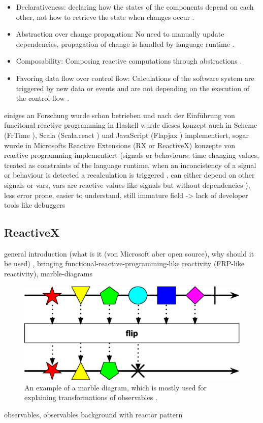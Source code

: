 \documentclass[Bachelor,BIF,english]{twbook}
\begin{document}
\begin{itemize}
\item Declarativeness: declaring how the states of the components depend on each other, not how to retrieve the state when changes occur \cite[p.~2]{PositivEffectOfRP}.
\item Abstraction over change propagation: No need to manually update dependencies, propagation of change is handled by language runtime \cite[p.~2]{PositivEffectOfRP}.
\item Composability: Composing reactive computations through abstractions \cite[p.~2]{PositivEffectOfRP}.
\item Favoring data flow over control flow: Calculations of the software system are triggered by new data or events and are not depending on the execution of the control flow \cite[p.~2]{PositivEffectOfRP}.
\end{itemize}
einiges an Forschung wurde schon betrieben und nach der Einführung von funcitonal reactive programming in Haskell wurde dieses konzept auch in Scheme (FrTime \cite{FrTime}), Scala (Scala.react \cite{DeprecatingOP}) und JavaScript (Flapjax \cite{Flapjax}) implementiert, sogar wurde in Microsofts Reactive Extensions (RX or ReactiveX) konzepte von reactive programming implementiert \cite[p.~954]{RPWalkthrough} \cite[p.~796]{DebuggingRP} \cite[p.~2]{PositivEffectOfRP}
(signals or behaviours: time changing values, treated as constraints of the language runtime, when an inconcistency of a signal or behaviour is detected a recalculation is triggered \cite[p.~797]{DebuggingRP} \cite[p.~3]{PositivEffectOfRP}, can either depend on other signals or vars, vars are reactive values like signals but without dependencies \cite[p.~2]{PositivEffectOfRP}), less error prone, easier to understand, still immature field -> lack of developer tools like debuggers \cite[p.~796]{DebuggingRP}

\subsection{ReactiveX}
general introduction (what is it \cite{ReactiveExtensions} (von Microsoft aber open source), why should it be used) \cite{ReactiveX}, bringing functional-reactive-programming-like reactivity (FRP-like reactivity), 
marble-diagrams
\begin{figure}[!htbp]
\centering
\includegraphics[width=0.5\linewidth]{PICs/marble_diagram.eps}
\caption{An example of a marble diagram, which is mostly used for explaining transformations of observables \cite{RxObservables}.}\label{Fig2}
\end{figure}
observables, observables background with reactor pattern \cite{RxObservables}
\end{document}
